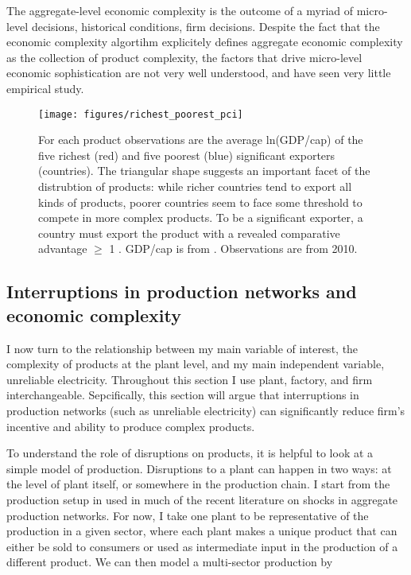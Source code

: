 \documentclass[11pt]{article}
\begin{document}
The aggregate-level economic complexity is the outcome of a myriad of micro-level decisions, historical conditions, firm decisions. Despite the fact that the economic complexity algortihm explicitely defines aggregate economic complexity as the collection of product complexity, the factors that drive micro-level economic sophistication are not very well understood, and have seen very little empirical study.

\begin{figure}[htpb]
	\centering
	\texttt{[image: figures/richest\_poorest\_pci]}
	\caption[Product sophistication by richest and poorest exporters]{For each product observations are the average ln(GDP/cap) of the five richest (red) and five poorest (blue) significant exporters (countries). The triangular shape suggests an important facet of the distrubtion of products: while richer countries tend to export all kinds of products, poorer countries seem to face some threshold to compete in more complex products. To be a significant exporter, a country must export the product with a revealed comparative advantage \(\geq\) 1  \citep{balassa_trade_1965}. GDP/cap is from \cite{world_bank_world_2020-1}. Observations are from 2010.}%
	\label{fig:framework-least-most}
\end{figure}

\subsection{Interruptions in production networks and economic complexity}
\label{sec:production_networks}
I now turn to the relationship between my main variable of interest, the complexity of products at the plant level, and my main independent variable, unreliable electricity. Throughout this section I use plant, factory, and firm interchangeable. Sepcifically, this section will argue that interruptions in production networks (such as unreliable electricity) can significantly reduce firm's incentive and ability to produce complex products.

To understand the role of disruptions on products, it is helpful to look at a simple model of production. Disruptions to a plant can happen in two ways: at the level of plant itself, or somewhere in the production chain. I start from the production setup in \cite{acemoglu_network_2012} used in much of the recent literature on shocks in aggregate production networks. For now, I take one plant to be representative of the production in a given sector, where each plant makes a unique product that can either be sold to consumers or used as intermediate input in the production of a different product. We can then model a multi-sector production by
\end{document}
